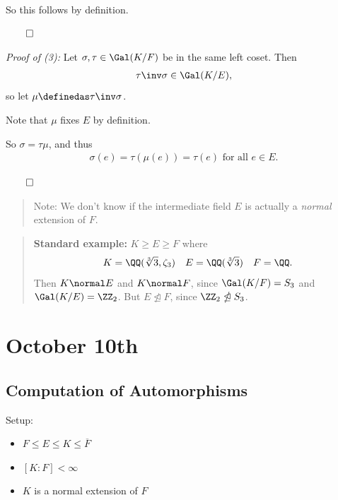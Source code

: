 So this follows by definition.

\(\qed\)

\emph{Proof of (3):} Let \(\sigma, \tau \in \Gal(K/F)\) be in the same
left coset. Then
\begin{align*}
\tau\inv\sigma \in \Gal(K/E)
,\end{align*} so let \(\mu \definedas \tau\inv\sigma\).

Note that \(\mu\) fixes \(E\) by definition.

So \(\sigma = \tau \mu\), and thus
\begin{align*}
\sigma(e) = \tau(\mu(e)) = \tau(e) \text{ for all } e\in E
.\end{align*}

\(\qed\)

\begin{quote}
Note: We don't know if the intermediate field \(E\) is actually a
\emph{normal} extension of \(F\).
\end{quote}

\begin{quote}
\textbf{Standard example:} \(K \geq E \geq F\) where
\begin{align*}
K = \QQ(\sqrt[3] 3, \zeta_3)\quad E = \QQ(\sqrt[3] 3) \quad F = \QQ
.\end{align*} Then \(K \normal E\) and \(K\normal F\), since
\(\Gal(K/F) = S_3\) and \(\Gal(K/E) = \ZZ_2\). But
\(E \ntrianglelefteq F\), since \(\ZZ_2 \ntrianglelefteq S_3\).
\end{quote}

\hypertarget{october-10th}{%
\section{October 10th}\label{october-10th}}

\hypertarget{computation-of-automorphisms}{%
\subsection{Computation of
Automorphisms}\label{computation-of-automorphisms}}

Setup:

\begin{itemize}
\item
  \(F \leq E \leq K \leq \overline F\)
\item
  \([K: F] < \infty\)
\item
  \(K\) is a normal extension of \(F\)
\end{itemize}

